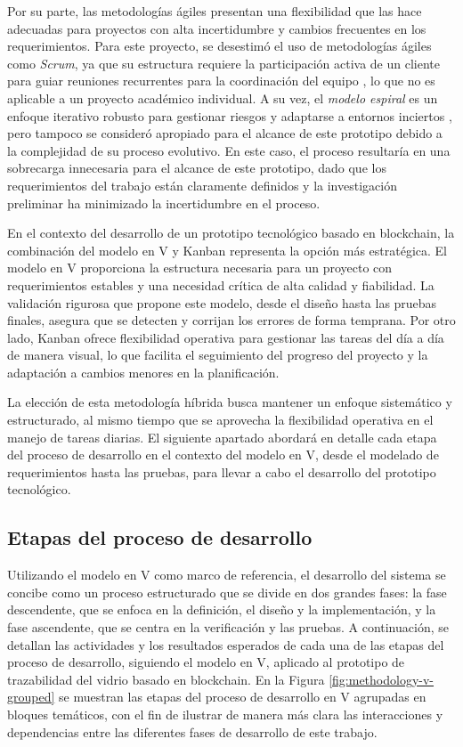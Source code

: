 Por su parte, las metodologías ágiles presentan una flexibilidad que las hace adecuadas para proyectos con alta incertidumbre y cambios frecuentes en los requerimientos. Para este proyecto, se desestimó el uso de metodologías ágiles como \textit{Scrum}, ya que su estructura requiere la participación activa de un cliente para guiar reuniones recurrentes para la coordinación del equipo \cite{pressman2010ingenieria}, lo que no es aplicable a un proyecto académico individual. A su vez, el \textit{modelo espiral} es un enfoque iterativo robusto para gestionar riesgos y adaptarse a entornos inciertos \cite{pressman2010ingenieria}, pero tampoco se consideró apropiado para el alcance de este prototipo debido a la complejidad de su proceso evolutivo. En este caso, el proceso resultaría en una sobrecarga innecesaria para el alcance de este prototipo, dado que los requerimientos del trabajo están claramente definidos y la investigación preliminar ha minimizado la incertidumbre en el proceso.

En el contexto del desarrollo de un prototipo tecnológico basado en blockchain, la combinación del modelo en V y Kanban representa la opción más estratégica. El modelo en V proporciona la estructura necesaria para un proyecto con requerimientos estables y una necesidad crítica de alta calidad y fiabilidad. La validación rigurosa que propone este modelo, desde el diseño hasta las pruebas finales, asegura que se detecten y corrijan los errores de forma temprana. Por otro lado, Kanban ofrece flexibilidad operativa para gestionar las tareas del día a día de manera visual, lo que facilita el seguimiento del progreso del proyecto y la adaptación a cambios menores en la planificación.

La elección de esta metodología híbrida busca mantener un enfoque sistemático y estructurado, al mismo tiempo que se aprovecha la flexibilidad operativa en el manejo de tareas diarias. El siguiente apartado abordará en detalle cada etapa del proceso de desarrollo en el contexto del modelo en V, desde el modelado de requerimientos hasta las pruebas, para llevar a cabo el desarrollo del prototipo tecnológico.

\subsection{Etapas del proceso de desarrollo}

Utilizando el modelo en V como marco de referencia, el desarrollo del sistema se concibe como un proceso estructurado que se divide en dos grandes fases: la fase descendente, que se enfoca en la definición, el diseño y la implementación, y la fase ascendente, que se centra en la verificación y las pruebas. A continuación, se detallan las actividades y los resultados esperados de cada una de las etapas del proceso de desarrollo, siguiendo el modelo en V, aplicado al prototipo de trazabilidad del vidrio basado en blockchain. En la Figura \ref{fig:methodology-v-grouped} se muestran las etapas del proceso de desarrollo en V agrupadas en bloques temáticos, con el fin de ilustrar de manera más clara las interacciones y dependencias entre las diferentes fases de desarrollo de este trabajo.

